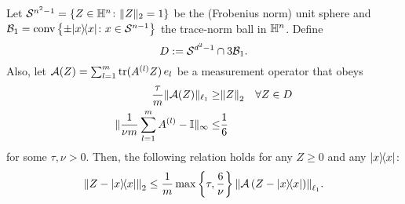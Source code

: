 \begin{proposition}%
  \label{prop:nsp_implication}
  Let $\mathcal{S}^{n^2-1}=\left\{  Z \in \mathbb{H}^n\colon \|  Z \|_2=1 \right\}$ be the (Frobenius norm) unit sphere and $\mathcal{B}_1 = \mathrm{conv} \left\{ \pm | x \rangle \! \langle  x| \colon  x \in \mathcal{S}^{n-1} \right\}$ the trace-norm ball in $\mathbb{H}^n$.
  Define
  \[
    D := \mathcal{S}^{d^2-1} \cap 3 \mathcal{B}_1.
    \label{eq:pl.D}
  \]
  Also, let $\mathcal{A}(Z) = \sum_{l=1}^m \operatorname{tr} ( A^{(l)}  Z ) \,  {e_l}$ be a measurement operator that obeys
  \begin{align}
      \frac{ \tau}{m} \| \mathcal{A}( Z) \|_{\ell_1} \geq& {\Vert Z\Vert}_2 \quad \forall  Z \in D \label{eq:pl.nsp}\\
      \| \frac{1}{\nu m}\sum_{l=1}^m  A^{(l)} -  \mathbb{I} \|_\infty \leq& \frac{1}{6}\label{eq:pl.approx_povm}
  \end{align}
  for some $\tau,\nu >0$.
  Then, the following relation holds for any $ Z \geq 0$ and any $\ketbra x$:
  \[
    \label{eq:pl.rec_guarantee}
    \Fnorm{Z - \ketbra{x}}
    \leq \frac{1}{m} \max \left\{ \tau, \frac{6}{\nu} \right\}  \Norm{\mathcal{A}\left( Z - \ketbra{x} \right)}_{\ell_1}.
  \]
\end{proposition}
